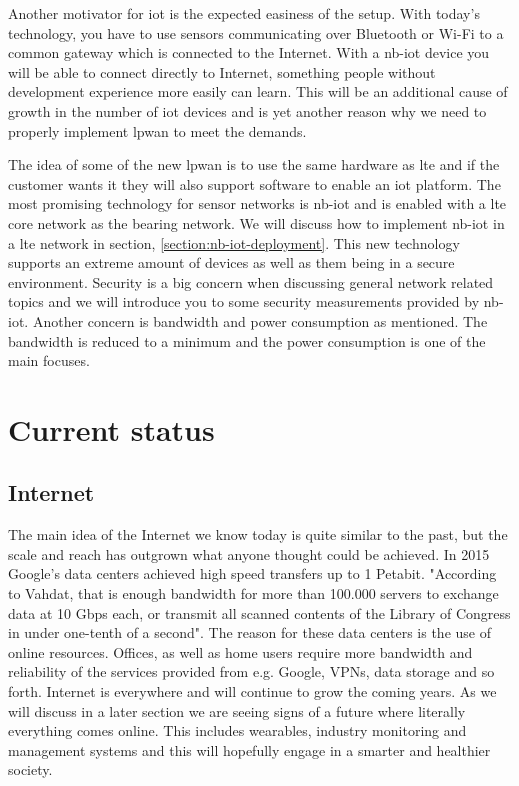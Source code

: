 \documentclass[USenglish]{ifimaster}  %
\begin{document}
Another motivator for \acrshort{iot} is the expected easiness of the setup. With today's technology, you have to use sensors communicating over Bluetooth or Wi-Fi to a common gateway which is connected to the Internet. With a \acrshort{nb-iot} device you will be able to connect directly to Internet, something people without development experience more easily can learn. This will be an additional cause of growth in the number of \acrshort{iot} devices and is yet another reason why we need to properly implement \acrshort{lpwan} to meet the demands.

The idea of some of the new \acrfull{lpwan} is to use the same hardware as \acrshort{lte} and if the customer wants it they will also support software to enable an \acrshort{iot} platform. The most promising technology for sensor networks is \acrfull{nb-iot} and is enabled with a \acrshort{lte} core network as the bearing network. We will discuss how to implement \acrshort{nb-iot} in a \acrshort{lte} network in section, \vref{section:nb-iot-deployment}. This new technology supports an extreme amount of devices as well as them being in a secure environment. Security is a big concern when discussing general network related topics and we will introduce you to some security measurements provided by \acrshort{nb-iot}. Another concern is bandwidth and power consumption as mentioned. The bandwidth is reduced to a minimum and the power consumption is one of the main focuses.

\section{Current status}
\subsection{Internet}
The main idea of the Internet we know today is quite similar to the past, but the scale and reach has outgrown what anyone thought could be achieved. In 2015 Google's data centers achieved high speed transfers up to 1 Petabit. "According to Vahdat, that is enough bandwidth for more than 100.000 servers to exchange data at 10 Gbps each, or transmit all scanned contents of the Library of Congress in under one-tenth of a second"\cite{online:petabitGoogle}. The reason for these data centers is the use of online resources. Offices, as well as home users require more bandwidth and reliability of the services provided from e.g. Google, VPNs, data storage and so forth.
Internet is everywhere and will continue to grow the coming years. As we will discuss in a later section we are seeing signs of a future where literally everything comes online. This includes wearables, industry monitoring and management systems and this will hopefully engage in a smarter and healthier society.
\end{document}
